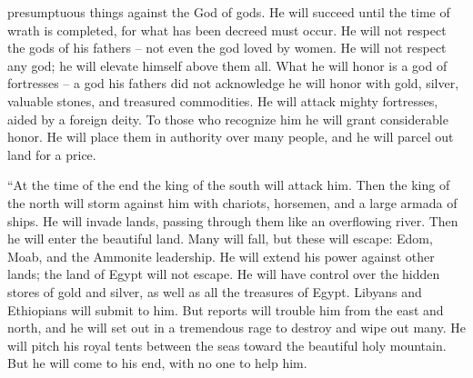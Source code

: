 {presumptuous things
against
the God
of gods.
He will succeed
until
the time of wrath
is completed,
for
what has been decreed
must occur.
He will not respect the gods
of his fathers
– not
even the god loved by women.
He will not
respect any
god;
he will elevate
himself above them
all.
What he will honor
is a god
of fortresses
– a god
his fathers
did not
acknowledge
he will honor
with gold,
silver,
valuable
stones,
and treasured commodities.
He will attack
mighty
fortresses,
aided by
a foreign
deity.
To those who
recognize
him he will grant considerable
honor.
He will place
them in authority over
many people,
and he will parcel out
land
for a price.
\par }{\PP {}“At the time
of the end
the king
of the south
will attack him. Then
the king
of the north
will storm against him
with chariots,
horsemen,
and a large
armada
of ships.
He will invade
lands,
passing
through them like an overflowing river.
Then he will enter
the beautiful
land.
Many
will fall,
but these
will escape: Edom,
Moab,
and the Ammonite
leadership.
He will extend
his power
against other lands;
the land
of Egypt
will not
escape.
He will have control
over the hidden stores
of gold
and silver,
as well as all
the treasures
of Egypt.
Libyans
and Ethiopians
will submit to him.
But reports
will trouble
him from the east
and north,
and he will set out
in a tremendous
rage
to destroy
and wipe out
many.
He will pitch
his royal
tents
between
the seas
toward the beautiful
holy
mountain.
But he will come
to
his end,
with no one
to help him.

\par }
